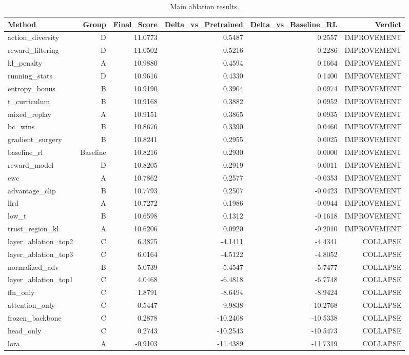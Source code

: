 \begin{table}[htbp]
\centering
\caption{Main ablation results.}
\label{tab:main_results}
\begin{tabular}{lrrrrr}
\toprule
\textbf{Method} & \textbf{Group} & \textbf{Final\_Score} & \textbf{Delta\_vs\_Pretrained} & \textbf{Delta\_vs\_Baseline\_RL} & \textbf{Verdict} \\
\midrule
action\_diversity & D & 11.0773 & 0.5487 & 0.2557 & IMPROVEMENT \\
reward\_filtering & D & 11.0502 & 0.5216 & 0.2286 & IMPROVEMENT \\
kl\_penalty & A & 10.9880 & 0.4594 & 0.1664 & IMPROVEMENT \\
running\_stats & D & 10.9616 & 0.4330 & 0.1400 & IMPROVEMENT \\
entropy\_bonus & B & 10.9190 & 0.3904 & 0.0974 & IMPROVEMENT \\
t\_curriculum & B & 10.9168 & 0.3882 & 0.0952 & IMPROVEMENT \\
mixed\_replay & A & 10.9151 & 0.3865 & 0.0935 & IMPROVEMENT \\
bc\_wins & B & 10.8676 & 0.3390 & 0.0460 & IMPROVEMENT \\
gradient\_surgery & B & 10.8241 & 0.2955 & 0.0025 & IMPROVEMENT \\
baseline\_rl & Baseline & 10.8216 & 0.2930 & 0.0000 & IMPROVEMENT \\
reward\_model & D & 10.8205 & 0.2919 & -0.0011 & IMPROVEMENT \\
ewc & A & 10.7862 & 0.2577 & -0.0353 & IMPROVEMENT \\
advantage\_clip & B & 10.7793 & 0.2507 & -0.0423 & IMPROVEMENT \\
llrd & A & 10.7272 & 0.1986 & -0.0944 & IMPROVEMENT \\
low\_t & B & 10.6598 & 0.1312 & -0.1618 & IMPROVEMENT \\
trust\_region\_kl & A & 10.6206 & 0.0920 & -0.2010 & IMPROVEMENT \\
layer\_ablation\_top2 & C & 6.3875 & -4.1411 & -4.4341 & COLLAPSE \\
layer\_ablation\_top3 & C & 6.0164 & -4.5122 & -4.8052 & COLLAPSE \\
normalized\_adv & B & 5.0739 & -5.4547 & -5.7477 & COLLAPSE \\
layer\_ablation\_top1 & C & 4.0468 & -6.4818 & -6.7748 & COLLAPSE \\
ffn\_only & C & 1.8791 & -8.6494 & -8.9424 & COLLAPSE \\
attention\_only & C & 0.5447 & -9.9838 & -10.2768 & COLLAPSE \\
frozen\_backbone & C & 0.2878 & -10.2408 & -10.5338 & COLLAPSE \\
head\_only & C & 0.2743 & -10.2543 & -10.5473 & COLLAPSE \\
lora & A & -0.9103 & -11.4389 & -11.7319 & COLLAPSE \\
\bottomrule
\end{tabular}
\end{table}